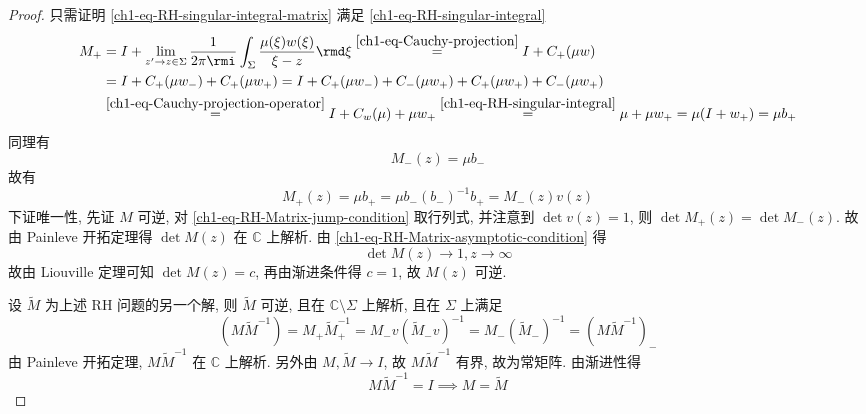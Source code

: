 \begin{proof}
    只需证明 \eqref{ch1-eq-RH-singular-integral-matrix} 满足 \eqref{ch1-eq-RH-singular-integral}
    \begin{equation}
        \begin{aligned}
            M_{+} & = I + \lim_{z' \to z \in \Sigma} \frac{1}{2 \pi \rmi }\int_{\Sigma} \frac{\mu(\xi) w(\xi)}{\xi - z} \rmd \xi \overset{\eqref{ch1-eq-Cauchy-projection}}{=} I + C_{+}(\mu w)      \\
                  & = I + C_{+}(\mu w_{-}) + C_{+}(\mu w_{+}) = I + C_{+}(\mu w_{-}) + C_{-}(\mu w_{+}) +   C_{+}(\mu w_{+}) + C_{-}(\mu w_{+})                                                      \\
                  & \overset{\eqref{ch1-eq-Cauchy-projection-operator}}{=} I + C_{w}(\mu) + \mu w_{+} \overset{\eqref{ch1-eq-RH-singular-integral}}{=} \mu + \mu w_{+} = \mu (I + w_{+}) = \mu b_{+}
        \end{aligned}
    \end{equation}
    同理有
    \begin{equation}
        M_{-}(z) = \mu b_{-}
    \end{equation}
    故有
    \begin{equation}
        M_{+}(z) = \mu b_{+} = \mu b_{-}(b_{-})^{-1} b_{+} = M_{-}(z)v(z)
    \end{equation}
    下证唯一性, 先证 $ M $ 可逆, 对 \eqref{ch1-eq-RH-Matrix-jump-condition} 取行列式, 并注意到 $ \det v(z) = 1 $, 则 $ \det M_{+}(z) = \det M_{-}(z) $. 故由 Painleve 开拓定理得 $ \det M(z) $ 在 $ \mathbb{C} $ 上解析. 由 \eqref{ch1-eq-RH-Matrix-asymptotic-condition} 得
    \begin{equation}
        \det M(z) \to 1, z \to \infty
    \end{equation}
    故由 Liouville 定理可知 $ \det M(z) = c $, 再由渐进条件得 $ c = 1 $, 故 $ M(z) $ 可逆.

    设 $ \widetilde{M} $ 为上述 RH 问题的另一个解, 则 $ \widetilde{M} $ 可逆, 且在 $ \mathbb{C} \setminus  \Sigma $ 上解析, 且在 $ \Sigma $ 上满足
    \begin{equation}
        (M \widetilde{M}^{-1}) = M_{+} \widetilde{M}_{+}^{-1} = M_{-} v (\widetilde{M}_{-} v)^{-1} = M_{-}(\widetilde{M}_{-})^{-1} = (M \widetilde{M}^{-1})_{-}
    \end{equation}
    由 Painleve 开拓定理, $ M \widetilde{M}^{-1} $ 在 $ \mathbb{C} $ 上解析. 另外由 $ M, \widetilde{M} \to I $, 故 $ M \widetilde{M}^{-1} $ 有界, 故为常矩阵. 由渐进性得
    \begin{equation}
        M \widetilde{M}^{-1} = I \implies M = \widetilde{M}
    \end{equation}
\end{proof}

